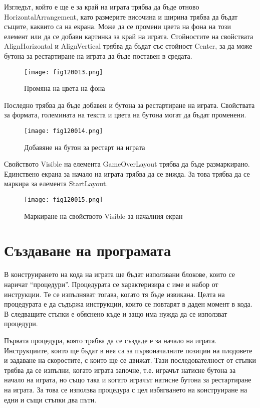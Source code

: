 Изгледът, който е ще е за край на играта трябва да бъде отново HorizontalArrangement, като размерите височина и ширина трябва да бъдат същите, каквито са на екрана. Може да се промени цвета на фона на този елемент или да се добави картинка за край на играта. Стойностите на свойствата AlignHorizontal и AlignVertical трябва да бъдат със стойност Center, за да може бутона за рестартиране на играта да бъде поставен в средата.

\begin{figure}[H]
  \centering
  \texttt{[image: fig120013.png]}
  \caption{Промяна на цвета на фона}
\label{fig120013}
\end{figure}

Последно трябва да бъде добавен и бутона за рестартиране на играта. Свойствата за формата, големината на текста и цвета на бутона могат да бъдат променени.

\begin{figure}[H]
  \centering
  \texttt{[image: fig120014.png]}
  \caption{Добавяне на бутон за рестарт на играта}
\label{fig120014}
\end{figure}

Свойството Visible на елемента GameOverLayout трябва да бъде размаркирано. Единствено екрана за начало на играта трябва да се вижда. За това трябва да се маркира за елемента StartLayout.

\begin{figure}[H]
  \centering
  \texttt{[image: fig120015.png]}
  \caption{Маркиране на свойството Visible за началния екран}
\label{fig120015}
\end{figure}

\section{Създаване на програмата}
В конструирането на кода на играта ще бъдат използвани блокове, които се наричат “процедури”. Процедурата се характеризира с име и набор от инструкции. Те се изпълняват тогава, когато тя бъде извикана. Целта на процедурата е да съдържа инструкции, които се повтарят в даден момент в кода. В следващите стъпки е обяснено къде и защо има нужда да се използват процедури.

Първата процедура, която трябва да се създаде е за начало на играта. Инструкциите, които ще бъдат в нея са за първоначалните позиции на плодовете и задаване на скоростите, с които ще се движат. Тази последователност от стъпки трябва да се изпълни, когато играта започне, т.е. играчът натисне бутона за начало на играта, но също така и когато играчът натисне бутона за рестартиране на играта. За това се използва процедура с цел избягването на конструиране на едни и същи стъпки два пъти.

